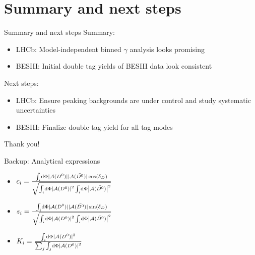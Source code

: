 \documentclass{beamer}
\begin{document}
\section{Summary and next steps}
\begin{frame}{Summary and next steps}
  Summary:
  \begin{itemize}
    \setlength\itemsep{1.0em}
    \item{LHCb: Model-independent binned $\gamma$ analysis looks promising}
    \item{BESIII: Initial double tag yields of BESIII data look consistent}
  \end{itemize}
  \vspace{0.3cm}
  Next steps:
  \begin{itemize}
    \setlength\itemsep{1.0em}
    \item{LHCb: Ensure peaking backgrounds are under control and study systematic uncertainties}
    \item{BESIII: Finalize double tag yield for all tag modes}
  \end{itemize}
  \vspace{0.5cm}
  \begin{center}
    {\huge Thank you!}
  \end{center}
\end{frame}

\begin{frame}{Backup: Analytical expressions}
  \begin{itemize}
    \setlength\itemsep{1.5em}
    \item{$c_i = \frac{\int_i\dd{\Phi}|\mathcal{A}(D^0)||\mathcal{A}(\bar{D^0})|\cos(\delta_D)}{\sqrt{\int_i\dd{\Phi}\abs{\mathcal{A}(D^0)}^2\int_i\dd{\Phi}\abs{\mathcal{A}(\bar{D^0})}^2}}$}
    \item{$s_i = \frac{\int_i\dd{\Phi}|\mathcal{A}(D^0)||\mathcal{A}(\bar{D^0})|\sin(\delta_D)}{\sqrt{\int_i\dd{\Phi}\abs{\mathcal{A}(D^0)}^2\int_i\dd{\Phi}\abs{\mathcal{A}(\bar{D^0})}^2}}$}
    \item{$K_i = \frac{\int_i\dd{\Phi}|\mathcal{A}(D^0)|^2}{\sum_j\int_j\dd{\Phi}\abs{\mathcal{A}(D^0)}^2}$}
  \end{itemize}
\end{frame}
\end{document}
